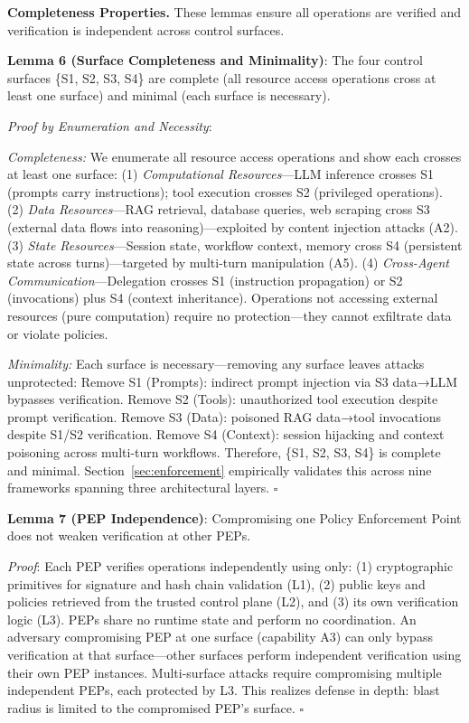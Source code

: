 \noindent\textbf{Completeness Properties.} These lemmas ensure all operations are verified and verification is independent across control surfaces.

\textbf{Lemma 6 (Surface Completeness and Minimality)}: The four control surfaces \{S1, S2, S3, S4\} are complete (all resource access operations cross at least one surface) and minimal (each surface is necessary).

\textit{Proof by Enumeration and Necessity}:

\textit{Completeness:} We enumerate all resource access operations and show each crosses at least one surface: (1) \textit{Computational Resources}—LLM inference crosses S1 (prompts carry instructions); tool execution crosses S2 (privileged operations). (2) \textit{Data Resources}—RAG retrieval, database queries, web scraping cross S3 (external data flows into reasoning)—exploited by content injection attacks (A2). (3) \textit{State Resources}—Session state, workflow context, memory cross S4 (persistent state across turns)—targeted by multi-turn manipulation (A5). (4) \textit{Cross-Agent Communication}—Delegation crosses S1 (instruction propagation) or S2 (invocations) plus S4 (context inheritance). Operations not accessing external resources (pure computation) require no protection—they cannot exfiltrate data or violate policies.

\textit{Minimality:} Each surface is necessary—removing any surface leaves attacks unprotected: Remove S1 (Prompts): indirect prompt injection via S3 data→LLM bypasses verification. Remove S2 (Tools): unauthorized tool execution despite prompt verification. Remove S3 (Data): poisoned RAG data→tool invocations despite S1/S2 verification. Remove S4 (Context): session hijacking and context poisoning across multi-turn workflows. Therefore, \{S1, S2, S3, S4\} is complete and minimal. Section~\ref{sec:enforcement} empirically validates this across nine frameworks spanning three architectural layers. $\square$

\textbf{Lemma 7 (PEP Independence)}: Compromising one Policy Enforcement Point does not weaken verification at other PEPs.

\textit{Proof}: Each PEP verifies operations independently using only: (1) cryptographic primitives for signature and hash chain validation (L1), (2) public keys and policies retrieved from the trusted control plane (L2), and (3) its own verification logic (L3). PEPs share no runtime state and perform no coordination. An adversary compromising PEP at one surface (capability A3) can only bypass verification at that surface—other surfaces perform independent verification using their own PEP instances. Multi-surface attacks require compromising multiple independent PEPs, each protected by L3. This realizes defense in depth: blast radius is limited to the compromised PEP's surface. $\square$

